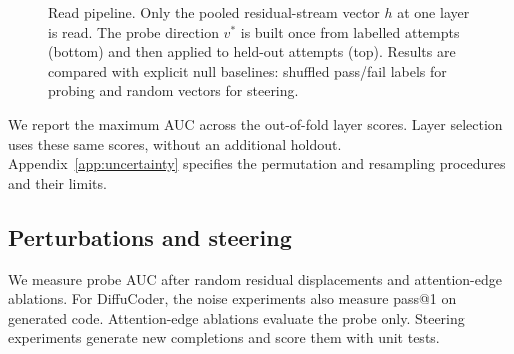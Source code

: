 \documentclass[11pt,letterpaper]{article}
\begin{document}
\begin{figure}[htbp]
\centering
{}
\caption{Read pipeline. Only the pooled residual-stream vector $h$ at one layer is read. The probe direction $v^{*}$ is built once from labelled attempts (bottom) and then
applied to held-out attempts (top). Results are compared with explicit null baselines: shuffled pass/fail labels for probing and random vectors for steering.}
\label{fig:pipeline}
\end{figure}

We report the maximum AUC across the out-of-fold layer scores. Layer selection uses these same scores, without an additional holdout. Appendix~\ref{app:uncertainty} specifies the permutation and resampling procedures and their limits.

\subsection{Perturbations and steering}

We measure probe AUC after random residual displacements and attention-edge ablations. For DiffuCoder, the noise experiments also measure pass@1 on generated code. Attention-edge ablations evaluate the probe only. Steering experiments generate new completions and score them with unit tests.
\end{document}
